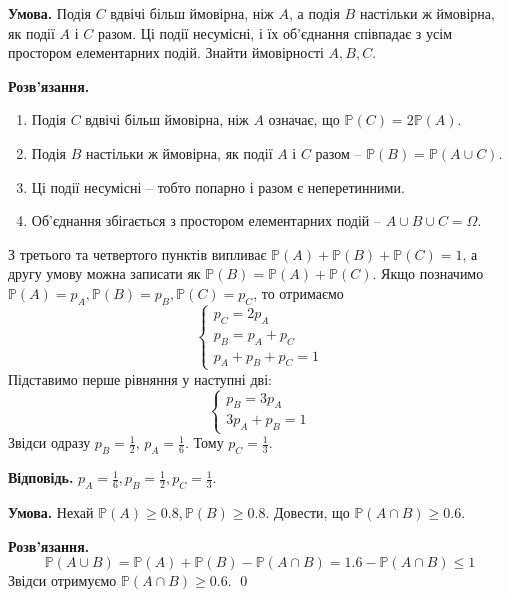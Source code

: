 \documentclass[oneside,solution]{karazin-prob-theory-assign}
\begin{document}

\hspace{20px}\textbf{Умова.} Подія $C$ вдвічі більш ймовірна, ніж $A$, а подія $B$ настільки ж ймовірна, як події $A$ і $C$ разом. Ці події несумісні, і їх об'єднання співпадає з усім простором елементарних подій. Знайти ймовірності $A,B,C$.

\textbf{Розв'язання.} 

\begin{enumerate}
    \item Подія $C$ вдвічі більш ймовірна, ніж $A$ означає, що $\mathbb{P}(C) = 2\mathbb{P}(A)$.
    \item Подія $B$ настільки ж ймовірна, як події $A$ і $C$ разом -- $\mathbb{P}(B) = \mathbb{P}(A \cup C)$.
    \item Ці події несумісні -- тобто попарно і разом є неперетинними.
    \item Об'єднання збігається з простором елементарних подій -- $A \cup B \cup C = \Omega$.
\end{enumerate}

З третього та четвертого пунктів випливає $\mathbb{P}(A) + \mathbb{P}(B)+\mathbb{P}(C)=1$, а другу умову можна записати як $\mathbb{P}(B)=\mathbb{P}(A)+\mathbb{P}(C)$. Якщо позначимо $\mathbb{P}(A)=p_A,\mathbb{P}(B)=p_B,\mathbb{P}(C)=p_C$, то отримаємо
\begin{equation}
    \begin{cases}
        p_C = 2p_A \\
        p_B = p_A+p_C \\
        p_A+p_B+p_C=1
    \end{cases}
\end{equation}
Підставимо перше рівняння у наступні дві:
\begin{equation}
    \begin{cases}
    p_B = 3p_A \\
    3p_A+p_B = 1
    \end{cases}
\end{equation}
Звідси одразу $p_B=\frac{1}{2}$, $p_A=\frac{1}{6}$. Тому $p_C=\frac{1}{3}$.

\textbf{Відповідь.} $p_A=\frac{1}{6},p_B=\frac{1}{2},p_C=\frac{1}{3}$.


\hspace{20px}\textbf{Умова.} Нехай $\mathbb{P}(A) \geq 0.8,\mathbb{P}(B) \geq 0.8$. Довести, що $\mathbb{P}(A\cap B) \geq 0.6$.

\textbf{Розв'язання.} 
\begin{equation}
    \mathbb{P}(A \cup B) = \mathbb{P}(A) + \mathbb{P}(B) - \mathbb{P}(A \cap B) = 1.6 - \mathbb{P}(A \cap B) \leq 1
\end{equation}
Звідси отримуємо $\mathbb{P}(A \cap B) \geq 0.6$. \qed
\end{document}

